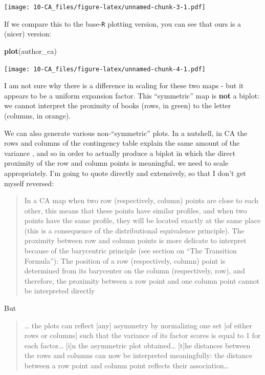 \documentclass[
]{book}
\newenvironment{Shaded}{\begin{snugshade}}{\end{snugshade}}
\newcommand{\FunctionTok}[1]{\textcolor[rgb]{0.13,0.29,0.53}{\textbf{#1}}}
\newcommand{\NormalTok}[1]{#1}
\begin{document}
\texttt{[image: 10-CA\_files/figure-latex/unnamed-chunk-3-1.pdf]}

If we compare this to the base-\texttt{R} plotting version, you can see that ours is a (nicer) version:

\begin{Shaded}
\begin{Highlighting}[]
\FunctionTok{plot}\NormalTok{(author\_ca)}
\end{Highlighting}
\end{Shaded}

\texttt{[image: 10-CA\_files/figure-latex/unnamed-chunk-4-1.pdf]}

I am not sure why there is a difference in scaling for these two maps - but it appears to be a uniform expansion factor. This ``symmetric'' map is \textbf{not} a biplot: we cannot interpret the proximity of books (rows, in green) to the letter (columns, in orange).

We can also generate various non-``symmetric'' plots. In a nutshell, in CA the rows and columns of the contingency table explain the same amount of the variance \citep[because of the sum to marginality/sum to one constraint,][]{abdiCorrespondence}, and so in order to actually produce a biplot in which the direct proximity of the row and column points is meaningful, we need to scale appropriately. I'm going to quote \citet[279]{abdiCorrespondence} directly and extensively, so that I don't get myself reversed:

\begin{quote}
In a CA map when two row (respectively, column) points are close to each other, this means that these points have similar profiles, and when two points have the same profile, they will be located exactly at the same place (this is a consequence of the distributional equivalence principle). The proximity between row and column points is more delicate to interpret because of the barycentric principle (see section on ``The Transition Formula''): The position of a row (respectively, column) point is determined from its barycenter on the column (respectively, row), and therefore, the proximity between a row point and one column point cannot be interpreted directly
\end{quote}

But

\begin{quote}
\ldots{} the plots can reflect {[}any{]} asymmetry by normalizing one set {[}of either rows or columns{]} such that the variance of its factor scores is equal to 1 for each factor\ldots{} {[}i{]}n the asymmetric plot obtained\ldots{} {[}t{]}he distances between the rows and columns can now be interpreted meaningfully: the distance between a row point and column point reflects their association\ldots{}
\end{quote}
\end{document}

